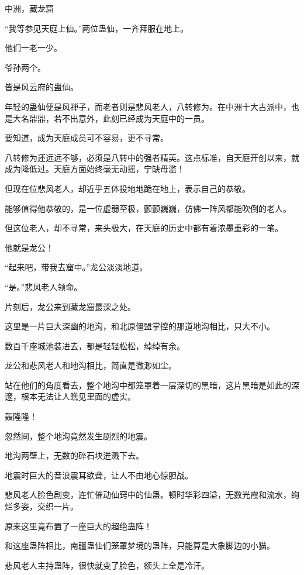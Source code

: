 
\begin{this_body}

中洲，藏龙窟

“我等参见天庭上仙。”两位蛊仙，一齐拜服在地上。

他们一老一少。

爷孙两个。

皆是风云府的蛊仙。

年轻的蛊仙便是风禅子，而老者则是悲风老人，八转修为。在中洲十大古派中，也是大名鼎鼎，若不出意外，此刻已经成为天庭中的一员。

要知道，成为天庭成员可不容易，更不寻常。

八转修为还远远不够，必须是八转中的强者精英。这点标准，自天庭开创以来，就成为降低过。天庭方面始终毫无动摇，宁缺毋滥！

但现在位悲风老人，却近乎五体投地地跪在地上，表示自己的恭敬。

能够值得他恭敬的，是一位虚弱至极，颤颤巍巍，仿佛一阵风都能吹倒的老人。

但这位老人，却不寻常，来头极大，在天庭的历史中都有着浓墨重彩的一笔。

他就是龙公！

“起来吧，带我去窟中。”龙公淡淡地道。

“是。”悲风老人领命。

片刻后，龙公来到藏龙窟最深之处。

这里是一片巨大深幽的地沟，和北原僵盟掌控的那道地沟相比，只大不小。

数百千座城池装进去，都是轻轻松松，绰绰有余。

龙公和悲风老人和地沟相比，简直是微渺如尘。

站在他们的角度看去，整个地沟中都笼罩着一层深切的黑暗，这片黑暗是如此的深邃，根本无法让人瞧见里面的虚实。

轰隆隆！

忽然间，整个地沟竟然发生剧烈的地震。

地沟两壁上，无数的碎石块迸溅下去。

地震时巨大的音浪震耳欲聋，让人不由地心惊胆战。

悲风老人脸色剧变，连忙催动仙窍中的仙蛊。顿时华彩四溢，无数光霞和流水，绚烂多姿，交织一片。

原来这里竟布置了一座巨大的超绝蛊阵！

和这座蛊阵相比，南疆蛊仙们笼罩梦境的蛊阵，只能算是大象脚边的小猫。

悲风老人主持蛊阵，很快就变了脸色，额头上全是冷汗。


\end{this_body}
